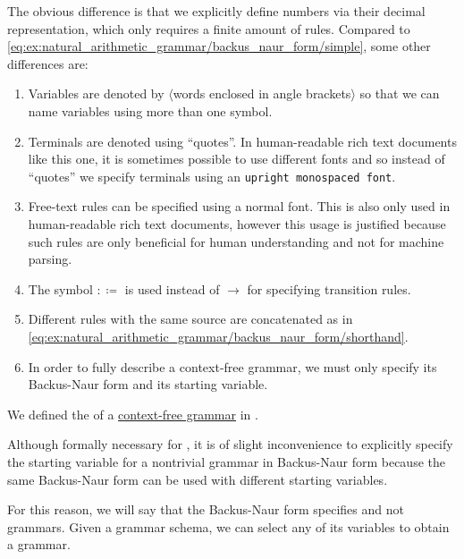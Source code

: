 \begin{example}
  The obvious difference is that we explicitly define numbers via their decimal representation, which only requires a finite amount of rules. Compared to \eqref{eq:ex:natural_arithmetic_grammar/backus_naur_form/simple}, some other differences are:
  \begin{enumerate}
    \item Variables are denoted by \( \langle \)words enclosed in angle brackets\( \rangle \) so that we can name variables using more than one symbol.
    \item Terminals are denoted using \enquote{quotes}. In human-readable rich text documents like this one, it is sometimes possible to use different fonts and so instead of \enquote{quotes} we specify terminals using an \texttt{upright monospaced font}.
    \item Free-text rules can be specified using a normal font. This is also only used in human-readable rich text documents, however this usage is justified because such rules are only beneficial for human understanding and not for machine parsing.
    \item The symbol \( :\coloneqq \) is used instead of \( \to \) for specifying transition rules.
    \item Different rules with the same source are concatenated as in \eqref{eq:ex:natural_arithmetic_grammar/backus_naur_form/shorthand}.
    \item In order to fully describe a context-free grammar, we must only specify its Backus-Naur form and its starting variable.
  \end{enumerate}
\end{example}

\begin{definition}\label{def:backus_naur_form}
  We defined the  of a \hyperref[def:grammar/context_free]{context-free grammar} in .

  Although formally necessary for , it is of slight inconvenience to explicitly specify the starting variable for a nontrivial grammar in Backus-Naur form because the same Backus-Naur form can be used with different starting variables.

  For this reason, we will say that the Backus-Naur form specifies  and not grammars. Given a grammar schema, we can select any of its variables to obtain a grammar.
\end{definition}

